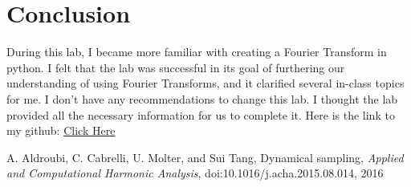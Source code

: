 \documentclass[12pt]{report}
\begin{document}
\section{Conclusion}

During this lab, I became more familiar with creating a Fourier Transform in python. I felt that the lab was successful in its goal of furthering our understanding of using Fourier Transforms, and it clarified several in-class topics for me. I don't have any recommendations to change this lab. I thought the lab provided all the necessary information for us to complete it. Here is the link to my github: \href{https://github.com/JMac1999}{Click Here}

\newpage


\begin{thebibliography}{111}

A. Aldroubi, C. Cabrelli, U. Molter, and Sui Tang,
Dynamical sampling, 
{\it  Applied and Computational Harmonic Analysis}, doi:10.1016/j.acha.2015.08.014, 2016


\end{thebibliography}
\end{document}
